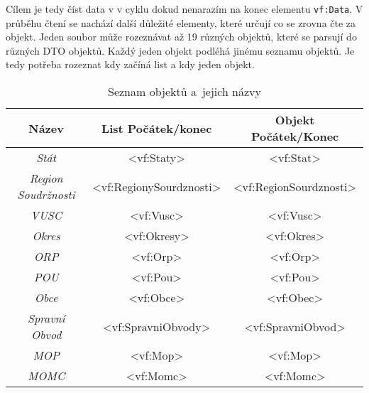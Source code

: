 Cílem je tedy číst data v v cyklu dokud nenarazím na konec elementu \texttt{vf:Data}.
V průběhu čtení se nachází další důležité elementy, které určují co se zrovna čte za objekt.
Jeden soubor může rozeznávat až 19 různých objektů, které se parsují do různých DTO objektů.
Každý jeden objekt podléhá jinému seznamu objektů.
Je tedy potřeba rozeznat kdy začíná list a kdy jeden objekt.
\begin{table}[!h]
    \label{tab:seznamObjektu}
    \caption{Seznam objektů a~jejich názvy}
    \begin{tabular}{|c|c|c|}
    \hline
    \textbf{Název}                       & \textbf{List Počátek/konec}                    & \textbf{Objekt Počátek/Konec}                 \\ \hline
    \textit{Stát}                        & \textless{}vf:Staty\textgreater{}              & \textless{}vf:Stat\textgreater{}              \\ \hline
    \textit{Region Soudržnosti}          & \textless{}vf:RegionySourdznosti\textgreater{} & \textless{}vf:RegionSourdznosti\textgreater{} \\ \hline
    \textit{VUSC}                        & \textless{}vf:Vusc\textgreater{}               & \textless{}vf:Vusc\textgreater{}              \\ \hline
    \textit{Okres}                       & \textless{}vf:Okresy\textgreater{}             & \textless{}vf:Okres\textgreater{}             \\ \hline
    \textit{ORP}                         & \textless{}vf:Orp\textgreater{}                & \textless{}vf:Orp\textgreater{}               \\ \hline
    \textit{POU}                         & \textless{}vf:Pou\textgreater{}                & \textless{}vf:Pou\textgreater{}               \\ \hline
    \textit{Obce}                        & \textless{}vf:Obce\textgreater{}               & \textless{}vf:Obec\textgreater{}              \\ \hline
    \textit{Spravní Obvod}               & \textless{}vf:SpravniObvody\textgreater{}      & \textless{}vf:SpravniObvod\textgreater{}      \\ \hline
    \textit{MOP}                         & \textless{}vf:Mop\textgreater{}                & \textless{}vf:Mop\textgreater{}               \\ \hline
    \textit{MOMC}                        & \textless{}vf:Momc\textgreater{}               & \textless{}vf:Momc\textgreater{}              \\ \hline

\end{tabular}
\end{table}
